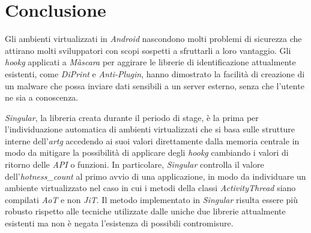 \chapter{Conclusione}
\label{conclusion}

Gli ambienti virtualizzati in \emph{Android} nascondono molti problemi di sicurezza che attirano molti sviluppatori con scopi sospetti a sfruttarli a loro vantaggio. 
Gli \emph{\gls{hookg}} applicati a \emph{Màscara} per aggirare le librerie di identificazione attualmente esistenti, come \emph{DiPrint} e \emph{Anti-Plugin}, hanno dimostrato la facilità di creazione di un malware che possa inviare dati sensibili a un server esterno, senza che l'utente ne sia a conoscenza.

\emph{Singular}, la libreria creata durante il periodo di stage, è la prima per l'individuazione automatica di ambienti virtualizzati che si basa sulle strutture interne dell'\emph{\gls{artg}} accedendo ai suoi valori direttamente dalla memoria centrale in modo da mitigare la possibilità di applicare degli \emph{\gls{hookg}} cambiando i valori di ritorno delle \emph{API} o funzioni.
In particolare, \emph{Singular} controlla il valore dell'\emph{hotness\_count} al primo avvio di una applicazione, in modo da individuare un ambiente virtualizzato nel caso in cui i metodi della classi \emph{ActivityThread} siano compilati \emph{AoT} e non \emph{JiT}.
Il metodo implementato in \emph{Singular} risulta essere più robusto rispetto alle tecniche utilizzate dalle uniche due librerie attualmente esistenti ma non è negata l'esistenza di possibili contromisure.

